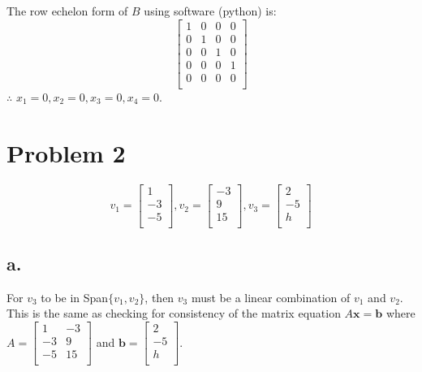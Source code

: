 \documentclass[12pt, a4paper]{article}
\begin{document}
The row echelon form of $B$ using software (python) is:
\[
    \begin{bmatrix}
        1 & 0 & 0 & 0 \\
        0 & 1 & 0 & 0 \\
        0 & 0 & 1 & 0 \\
        0 & 0 & 0 & 1 \\
        0 & 0 & 0 & 0 \\
    \end{bmatrix}
\]
$\therefore$ $x_1 = 0, x_2 = 0, x_3 = 0, x_4 = 0$.

\newpage

\section*{Problem 2}

\[
    v_1 = \begin{bmatrix}
        1 \\
        -3 \\
        -5 \\
        \end{bmatrix}, v_2 = \begin{bmatrix}
            -3 \\
            9 \\
            15 \\
        \end{bmatrix}, v_3 = \begin{bmatrix}
            2 \\
            -5 \\
            h \\
        \end{bmatrix}
\]

\subsection*{a.}
For $v_3$ to be in Span$\{v_1, v_2\}$, then $v_3$ must be a linear combination of $v_1$ and $v_2$. This is the same as checking for consistency of the matrix equation $A\boldsymbol{x} = \boldsymbol{b}$ where $A = \begin{bmatrix}
    1 & -3 \\
    -3 & 9 \\
    -5 & 15 \\
\end{bmatrix}$ and $\boldsymbol{b} = \begin{bmatrix}
    2 \\
    -5 \\
    h \\
\end{bmatrix}$.
\end{document}
